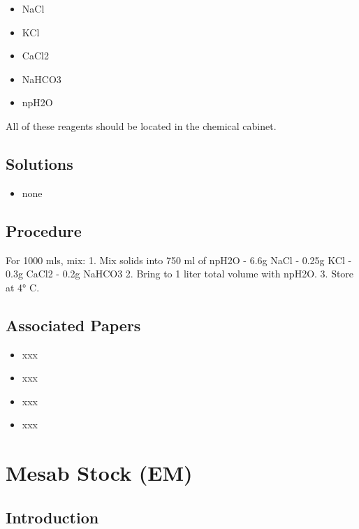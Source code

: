 \documentclass[
  letterpaper,
  DIV=11,
  numbers=noendperiod]{scrreprt}
\providecommand{\tightlist}{%
  \setlength{\itemsep}{0pt}\setlength{\parskip}{0pt}}\usepackage{longtable,booktabs,array}
\begin{document}
\begin{itemize}
\tightlist
\item
  NaCl
\item
  KCl
\item
  CaCl2
\item
  NaHCO3
\item
  npH2O
\end{itemize}

All of these reagents should be located in the chemical cabinet.

\hypertarget{solutions-58}{%
\section{Solutions}\label{solutions-58}}

\begin{itemize}
\tightlist
\item
  none
\end{itemize}

\hypertarget{procedure-63}{%
\section{Procedure}\label{procedure-63}}

For 1000 mls, mix: 1. Mix solids into 750 ml of npH2O - 6.6g NaCl -
0.25g KCl - 0.3g CaCl2 - 0.2g NaHCO3 2. Bring to 1 liter total volume
with npH2O. 3. Store at 4° C.

\hypertarget{associated-papers-43}{%
\section{Associated Papers}\label{associated-papers-43}}

\begin{itemize}
\tightlist
\item
  xxx
\item
  xxx
\item
  xxx
\item
  xxx
\end{itemize}

\hypertarget{sec-general_recipe_mesab}{%
\chapter{Mesab Stock (EM)}\label{sec-general_recipe_mesab}}

\hypertarget{introduction-68}{%
\section{Introduction}\label{introduction-68}}
\end{document}
